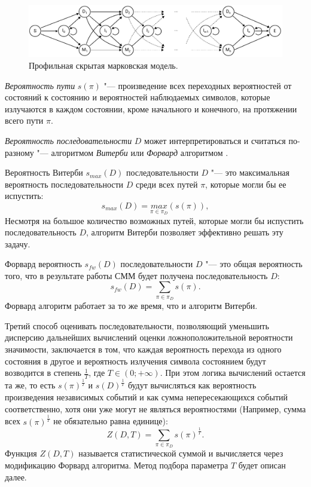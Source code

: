 \documentclass[]{article}
\begin{document}
			\begin{figure}[h]
				\includegraphics[width=15cm]{figure2}
				\centering
				\caption{Профильная скрытая марковская модель.}
			\end{figure}
			
			\textit{Вероятность пути} $s(\pi)$ "--- произведение всех переходных вероятностей от состояний к состоянию и вероятностей наблюдаемых символов, которые излучаются в каждом состоянии, кроме начального и конечного, на протяжении всего пути $\pi$. 
			
			\textit{Вероятность последовательности} $D$ может интерпретироваться и считаться по-разному "--- алгоритмом \textit{Витерби} или \textit{Форвард} алгоритмом \cite{Dugad96, Compeau15_2}.
			
			Вероятность Витерби $s_{max}(D)$ последовательности $D$ "--- это максимальная вероятность последовательности $D$ среди всех путей $\pi$, которые могли бы ее испустить:
			\begin{equation}
				s_{max}(D) = \underset{\pi \in \pi_{D}}{max}(s(\pi)),
			\end{equation}
			Несмотря на большое количество возможных путей, которые могли бы испустить последовательность $D$, алгоритм Витерби позволяет эффективно решать эту задачу.
			
			Форвард вероятность $s_{fw}(D)$ последовательности $D$ "--- это общая вероятность того, что в результате работы СММ будет получена последовательность $D$:
			\begin{equation}
				s_{fw}(D) = \sum_{\pi \in \pi_{D}}s(\pi).
			\end{equation}
			Форвард алгоритм работает за то же время, что и алгоритм Витерби.
			
			Третий способ оценивать последовательности, позволяющий уменьшить дисперсию дальнейших вычислений оценки ложноположительной вероятности значимости, заключается в том, что каждая вероятность перехода из одного состояния в другое и вероятность излучения символа состоянием будут возводится в степень $\frac{1}{T}$, где $T \in (0; +\infty)$. При этом логика вычислений остается та же, то есть $s(\pi)^{\frac{1}{T}}$ и $s(D)^{\frac{1}{T}}$ будут вычисляться как вероятность произведения независимых событий и как сумма непересекающихся событий соответственно, хотя они уже могут не являться вероятностями (Например, сумма всех $s(\pi)^\frac{1}{T}$ не обязательно равна единице):
			\begin{equation}
				Z(D, T)	= \sum_{\pi \in \pi_{D}}s(\pi)^{\frac{1}{T}}.
			\end{equation}		
			Функция $Z(D, T)$ называется статистической суммой и вычисляется через модификацию Форвард алгоритма. Метод подбора параметра $T$ будет описан далее.
			
\end{document}
